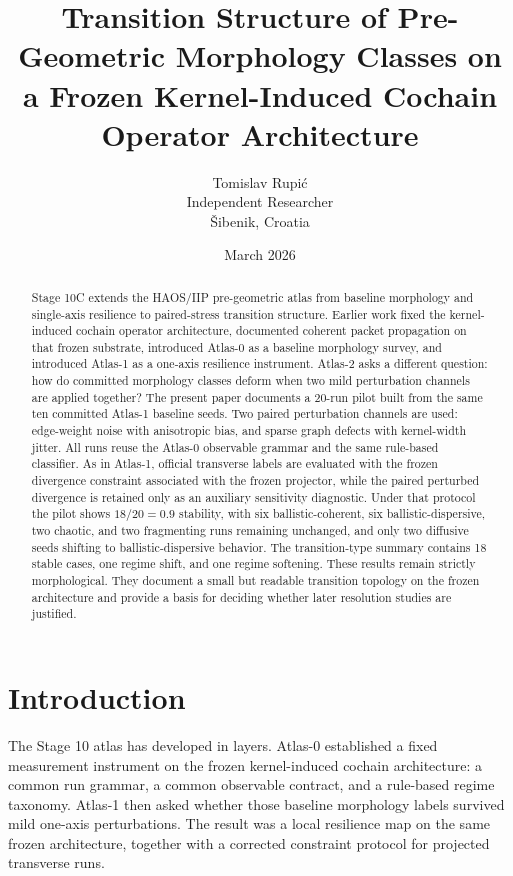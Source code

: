 \documentclass[11pt]{article}
\title{Transition Structure of Pre-Geometric Morphology Classes on a Frozen Kernel-Induced Cochain Operator Architecture}
\author{Tomislav Rupi\'c\\Independent Researcher\\\v{S}ibenik, Croatia}
\date{March 2026}
\begin{document}
\maketitle

\begin{abstract}
Stage 10C extends the HAOS/IIP pre-geometric atlas from baseline morphology and single-axis resilience to paired-stress transition structure. Earlier work fixed the kernel-induced cochain operator architecture, documented coherent packet propagation on that frozen substrate, introduced Atlas-0 as a baseline morphology survey, and introduced Atlas-1 as a one-axis resilience instrument. Atlas-2 asks a different question: how do committed morphology classes deform when two mild perturbation channels are applied together? The present paper documents a 20-run pilot built from the same ten committed Atlas-1 baseline seeds. Two paired perturbation channels are used: edge-weight noise with anisotropic bias, and sparse graph defects with kernel-width jitter. All runs reuse the Atlas-0 observable grammar and the same rule-based classifier. As in Atlas-1, official transverse labels are evaluated with the frozen divergence constraint associated with the frozen projector, while the paired perturbed divergence is retained only as an auxiliary sensitivity diagnostic. Under that protocol the pilot shows $18/20=0.9$ stability, with six ballistic-coherent, six ballistic-dispersive, two chaotic, and two fragmenting runs remaining unchanged, and only two diffusive seeds shifting to ballistic-dispersive behavior. The transition-type summary contains 18 stable cases, one regime shift, and one regime softening. These results remain strictly morphological. They document a small but readable transition topology on the frozen architecture and provide a basis for deciding whether later resolution studies are justified.
\end{abstract}

\section{Introduction}
The Stage 10 atlas has developed in layers. Atlas-0 established a fixed measurement instrument on the frozen kernel-induced cochain architecture: a common run grammar, a common observable contract, and a rule-based regime taxonomy. Atlas-1 then asked whether those baseline morphology labels survived mild one-axis perturbations. The result was a local resilience map on the same frozen architecture, together with a corrected constraint protocol for projected transverse runs.
\end{document}
